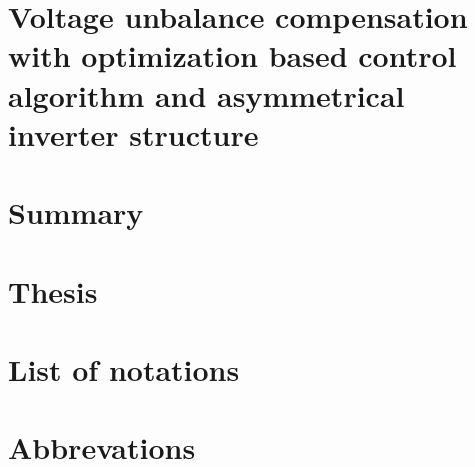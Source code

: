 \documentclass[12pt, a4paper, oneside, table]{report}
\begin{document}
 \chapter{Voltage unbalance compensation with optimization based control algorithm and asymmetrical inverter structure}
 

 \chapter{Summary}
 

 \chapter{Thesis}
 

 \chapter*{List of notations}
 

 \chapter*{Abbrevations}
 


 \newpage
 \pagestyle{plain}
 
 
\end{document}
